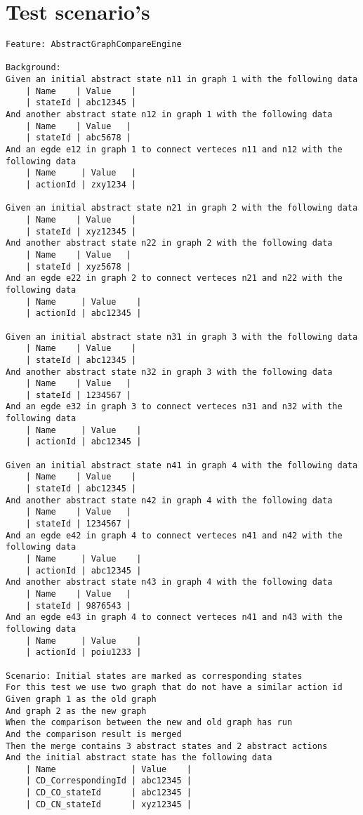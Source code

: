 \chapter{Test scenario's} \label{appendix:test-scenarios}

\begin{lstlisting}[language=Gherkin, caption=Test Scenario's, label=code:gherkin-tests]
Feature: AbstractGraphCompareEngine

Background:
Given an initial abstract state n11 in graph 1 with the following data
    | Name    | Value    |
    | stateId | abc12345 |
And another abstract state n12 in graph 1 with the following data
    | Name    | Value   |
    | stateId | abc5678 |
And an egde e12 in graph 1 to connect verteces n11 and n12 with the following data
    | Name     | Value   |
    | actionId | zxy1234 |

Given an initial abstract state n21 in graph 2 with the following data
    | Name    | Value    |
    | stateId | xyz12345 |
And another abstract state n22 in graph 2 with the following data
    | Name    | Value   |
    | stateId | xyz5678 |
And an egde e22 in graph 2 to connect verteces n21 and n22 with the following data
    | Name     | Value    |
    | actionId | abc12345 |

Given an initial abstract state n31 in graph 3 with the following data
    | Name    | Value    |
    | stateId | abc12345 |
And another abstract state n32 in graph 3 with the following data
    | Name    | Value   |
    | stateId | 1234567 |
And an egde e32 in graph 3 to connect verteces n31 and n32 with the following data
    | Name     | Value    |
    | actionId | abc12345 |

Given an initial abstract state n41 in graph 4 with the following data
    | Name    | Value    |
    | stateId | abc12345 |
And another abstract state n42 in graph 4 with the following data
    | Name    | Value   |
    | stateId | 1234567 |
And an egde e42 in graph 4 to connect verteces n41 and n42 with the following data
    | Name     | Value    |
    | actionId | abc12345 |
And another abstract state n43 in graph 4 with the following data
    | Name    | Value   |
    | stateId | 9876543 |
And an egde e43 in graph 4 to connect verteces n41 and n43 with the following data
    | Name     | Value    |
    | actionId | poiu1233 | 

Scenario: Initial states are marked as corresponding states
For this test we use two graph that do not have a similar action id 
Given graph 1 as the old graph
And graph 2 as the new graph
When the comparison between the new and old graph has run
And the comparison result is merged
Then the merge contains 3 abstract states and 2 abstract actions
And the initial abstract state has the following data
    | Name               | Value    |
    | CD_CorrespondingId | abc12345 |
    | CD_CO_stateId      | abc12345 |
    | CD_CN_stateId      | xyz12345 |


\end{lstlisting}
